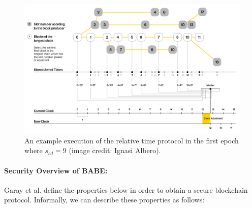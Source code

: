 \documentclass{article}
\begin{document}
\begin{figure}[h]
	\centering
	\includegraphics[width=1.\textwidth]{BABE3.png}
	\caption{An example execution of the relative time protocol in the first epoch where $s_{cd} = 9$ (image credit: Ignasi Albero).}
	\label{fig:relativetime}
\end{figure}



\paragraph{Security Overview of BABE:} Garay et al. \cite{backbone} define the properties below in order to obtain a secure blockchain protocol. Informally, we can describe these properties as follows:
\end{document}
